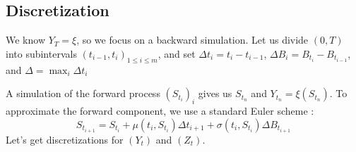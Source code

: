 \subsection{Discretization}

We know $Y_T = \xi$, so we focus on a backward simulation. 
Let us divide $(0,T)$ into subintervals $(t_{i - 1}, t_i)_{1 \leq i \leq m}$, and set $\Delta t_i = t_i - t_{i - 1}$, $\Delta B_i = B_{t_i} - B_{t_{i - 1}} $, and $\Delta = \max_i \Delta t_i$

A simulation of the forward process $(S_{t_i})_i$ gives us $S_{t_n}$ and $Y_{t_n} = \xi(S_{t_n})$. To approximate the forward component, we use a standard Euler
scheme : 
\begin{displaymath}
S_{t_{i + 1}} =  S_{t_i} + \mu(t_i,S_{t_i})\Delta t_{i + 1} + \sigma (t_i, S_{t_i}) \Delta B_{t_{i + 1}}
\end{displaymath}
Let's get discretizations for $(Y_t)$ and $(Z_t)$. 

